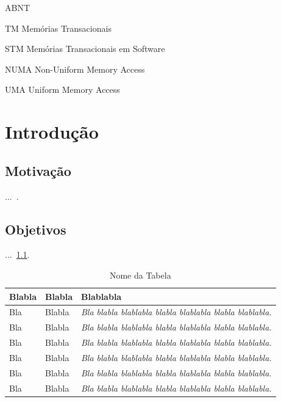 \documentclass[diss,capa]{texufpel}
\begin{document}
\listoffigures

\listoftables

\begin{listofabbrv}{ABNT}%
        \item[TM] Memórias Transacionais
        \item[STM] Memórias Transacionais em Software
        \item[NUMA] Non-Uniform Memory Access
        \item[UMA] Uniform Memory Access
\end{listofabbrv}

\tableofcontents

\chapter{Introdução}

\section{Motivação}
...~\cite{vonNeumann:1966:TSR}.

\section{Objetivos}

...~\ref{tabela}.

\begin{table}
  \begin{center}
    \caption{Nome da Tabela}\label{tabela}
    \begin{tabular}{p{4cm}p{5cm}p{6cm}}
      \hline
      Blabla & Blabla & Blablabla\\
      \hline
      {\small Bla} & {\small Blabla} & {\small\em Bla blabla blablabla blabla
        blablabla blabla blablabla.}\\
      {\small Bla} & {\small Blabla} & {\small\em Bla blabla blablabla blabla
        blablabla blabla blablabla.}\\
      {\small Bla} & {\small Blabla} & {\small\em Bla blabla blablabla blabla
        blablabla blabla blablabla.}\\
      {\small Bla} & {\small Blabla} & {\small\em Bla blabla blablabla blabla
        blablabla blabla blablabla.}\\
      {\small Bla} & {\small Blabla} & {\small\em Bla blabla blablabla blabla
        blablabla blabla blablabla.}\\
      {\small Bla} & {\small Blabla} & {\small\em Bla blabla blablabla blabla
        blablabla blabla blablabla.}\\
      \hline
    \end{tabular}
  \end{center}
\end{table}
\end{document}
